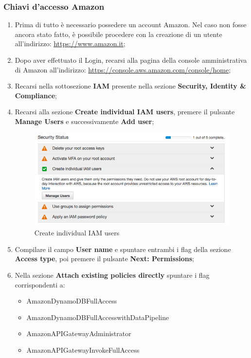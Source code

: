\documentclass[../ManualeSviluppatore_v2.0.0.tex]{subfiles}
\begin{document}
		\subsubsection{Chiavi d'accesso Amazon}
			\begin{enumerate}
			\item Prima di tutto è necessario possedere un account Amazon. Nel caso non fosse ancora stato fatto, è possibile procedere con la creazione di un utente all'indirizzo: \url{https://www.amazon.it};
			\item Dopo aver effettuato il Login, recarsi alla pagina della console amministrativa di Amazon all'indirizzo: \url{https://console.aws.amazon.com/console/home};
			\item Recarsi nella sottosezione \textbf{IAM} presente nella sezione \textbf{Security, Identity \& Compliance};
			\newpage
			\item Recarsi alla sezione \textbf{Create individual IAM users}, premere il pulsante \textbf{Manage Users} e successivamente \textbf{Add user};
			\begin{figure}[!h]
				\centering
				\includegraphics[scale=0.45]{Screenshot/IAMusers.png}
				\caption{Create individual IAM users}
			\end{figure}
			\item Compilare il campo \textbf{User name} e spuntare entrambi i flag della sezione \textbf{Access type}, poi premere il pulsante \textbf{Next: Permissions};
			\item Nella sezione \textbf{Attach existing policies directly} spuntare i flag corrispondenti a:
				\begin{itemize}
					\item AmazonDynamoDBFullAccess
					\item AmazonDynamoDBFullAccesswithDataPipeline
					\item AmazonAPIGatewayAdministrator
					\item AmazonAPIGatewayInvokeFullAccess

\end{itemize}
\end{enumerate}
\end{document}
